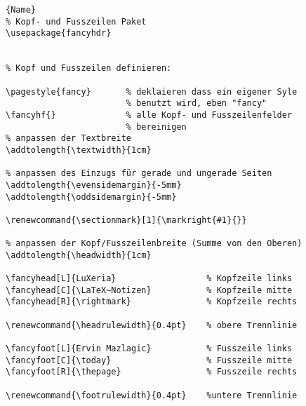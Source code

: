 \begin{center}
\begin{lstlisting}[caption=Kopf- und Fusszeilen]{Name}
% Kopf- und Fusszeilen Paket
\usepackage{fancyhdr}


% Kopf und Fusszeilen definieren:

\pagestyle{fancy}       % deklaieren dass ein eigener Syle
                        % benutzt wird, eben "fancy"
\fancyhf{}              % alle Kopf- und Fusszeilenfelder
                        % bereinigen
% anpassen der Textbreite
\addtolength{\textwidth}{1cm}           

% anpassen des Einzugs für gerade und ungerade Seiten
\addtolength{\evensidemargin}{-5mm}
\addtolength{\oddsidemargin}{-5mm}

\renewcommand{\sectionmark}[1]{\markright{#1}{}}

% anpassen der Kopf/Fusszeilenbreite (Summe von den Oberen)
\addtolength{\headwidth}{1cm}           

\fancyhead[L]{LuXeria}                  % Kopfzeile links
\fancyhead[C]{\LaTeX~Notizen}           % Kopfzeile mitte
\fancyhead[R]{\rightmark}               % Kopfzeile rechts

\renewcommand{\headrulewidth}{0.4pt}    % obere Trennlinie

\fancyfoot[L]{Ervin Mazlagic}           % Fusszeile links
\fancyfoot[C]{\today}                   % Fusszeile mitte
\fancyfoot[R]{\thepage}                 % Fusszeile rechts

\renewcommand{\footrulewidth}{0.4pt}    %untere Trennlinie
\end{lstlisting}
\end{center}




